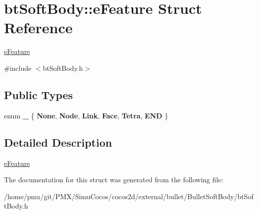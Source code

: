 \hypertarget{structbtSoftBody_1_1eFeature}{}\section{bt\+Soft\+Body\+:\+:e\+Feature Struct Reference}
\label{structbtSoftBody_1_1eFeature}


\hyperlink{structbtSoftBody_1_1eFeature}{e\+Feature}  




{\ttfamily \#include $<$bt\+Soft\+Body.\+h$>$}

\subsection*{Public Types}
\begin{DoxyCompactItemize}
\item 
\mbox{\label{structbtSoftBody_1_1eFeature_a51ea05112f741010b57b8deadf135f7a}} 
enum {\bfseries \+\_\+} \{ \newline
{\bfseries None}, 
{\bfseries Node}, 
{\bfseries Link}, 
{\bfseries Face}, 
\newline
{\bfseries Tetra}, 
{\bfseries E\+ND}
 \}
\end{DoxyCompactItemize}


\subsection{Detailed Description}
\hyperlink{structbtSoftBody_1_1eFeature}{e\+Feature} 

The documentation for this struct was generated from the following file\+:\begin{DoxyCompactItemize}
\item 
/home/pmx/git/\+P\+M\+X/\+Simu\+Cocos/cocos2d/external/bullet/\+Bullet\+Soft\+Body/bt\+Soft\+Body.\+h\end{DoxyCompactItemize}
